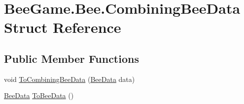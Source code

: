 \hypertarget{struct_bee_game_1_1_bee_1_1_combining_bee_data}{}\section{Bee\+Game.\+Bee.\+Combining\+Bee\+Data Struct Reference}
\label{struct_bee_game_1_1_bee_1_1_combining_bee_data}
\subsection*{Public Member Functions}
\begin{DoxyCompactItemize}
\item 
void \hyperlink{struct_bee_game_1_1_bee_1_1_combining_bee_data_abdf4646728337da76097aed9b74347ae}{To\+Combining\+Bee\+Data} (\hyperlink{struct_bee_game_1_1_bee_1_1_bee_data}{Bee\+Data} data)
\item 
\hyperlink{struct_bee_game_1_1_bee_1_1_bee_data}{Bee\+Data} \hyperlink{struct_bee_game_1_1_bee_1_1_combining_bee_data_a8f49452b4800bbc401a225e2676eeca0}{To\+Bee\+Data} ()
\end{DoxyCompactItemize}
